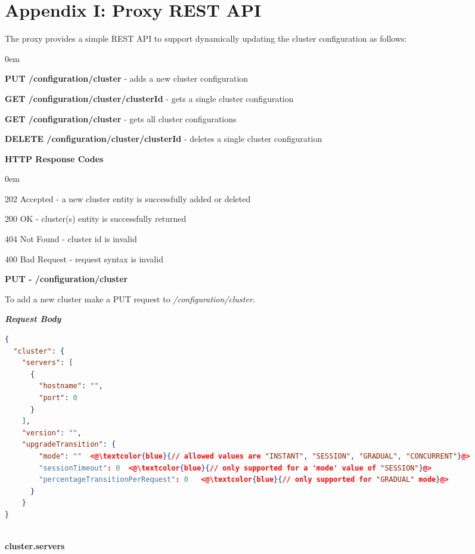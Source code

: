 \documentclass[a4paper,11pt,twoside]{report}
\begin{document}
\section*{Appendix I: Proxy REST API}\label{Appendix I}
The proxy provides a simple REST API to support dynamically updating the cluster configuration as follows:

\begin{list}{-}{}
  \itemsep0em
  \item \textbf{PUT /configuration/cluster} - adds a new cluster configuration  
 \item\textbf{GET /configuration/cluster/{clusterId}} - gets a single cluster configuration
 \item\textbf{GET /configuration/cluster} - gets all cluster configurations
 \item\textbf{DELETE /configuration/cluster/{clusterId}} - deletes a single cluster configuration
\end{list}

\noindent
\textbf{HTTP Response Codes}
\begin{list}{-}{}
  \itemsep0em
\item 202 Accepted - a new cluster entity is successfully added or deleted 
\item 200 OK - cluster(s) entity is successfully returned   
\item 404 Not Found - cluster id is invalid
\item 400 Bad Request - request syntax is  invalid
\end{list}

\noindent
\textbf{PUT - /configuration/cluster}

\noindent
To add a new cluster make a PUT request to \textit{/configuration/cluster}.\bigskip

\noindent
\textit{\textbf{Request Body}}
 
\begin{lstlisting}[language=json]
{
  "cluster": {
    "servers": [
      {
        "hostname": "",
        "port": 0
      }
    ],
    "version": "",
    "upgradeTransition": {
        "mode": ""  <@\textcolor{blue}{// allowed values are "INSTANT", "SESSION", "GRADUAL", "CONCURRENT"}@>
        "sessionTimeout": 0  <@\textcolor{blue}{// only supported for a 'mode' value of "SESSION"}@> 
        "percentageTransitionPerRequest": 0   <@\textcolor{blue}{// only supported for "GRADUAL" mode}@>
      }
    }
}
\end{lstlisting}

\noindent\\
\textbf{cluster.servers}
\end{document}
